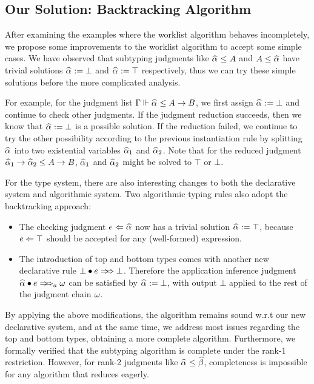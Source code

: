 

\subsection{Our Solution: Backtracking Algorithm}

After examining the examples where the worklist algorithm behaves incompletely,
we propose some improvements to the worklist algorithm to accept some simple cases.
We have observed that subtyping judgments like $\al \le A$ and $A \le \al$ have trivial solutions
$\al := \bot$ and $\al := \top$ respectively,
thus we can try these simple solutions before the more complicated analysis.

For example, for the judgment list $\Gm \Vdash \al \le A \to B$,
we first assign $\al := \bot$ and continue to check other judgments.
If the judgment reduction succeeds, then we know that $\al := \bot$ is a possible solution.
If the reduction failed, we continue to try the other possibility according to the
previous instantiation rule by splitting $\al$ into two existential variables $\al[1]$ and $\al[2]$.
Note that for the reduced judgment $\al[1] \to \al[2] \le A \to B$,
$\al[1]$ and $\al[2]$ might be solved to $\top$ or $\bot$.

For the type system, there are also interesting changes to
both the declarative system and algorithmic system.
Two algorithmic typing rules also adopt the backtracking approach:
\begin{itemize}
    \item The checking judgment $e \Lto \al$ now has a trivial solution $\al := \top$,
        because $e \Leftarrow \top$ should be accepted for any (well-formed) expression.
    \item The introduction of top and bottom types comes with another new declarative rule
        $\appInf{\bot}{e}{\bot}$.
        Therefore the application inference judgment $\appInfAlg{\al}{e}$
        can be satisfied by $\al := \bot$,
        with output $\bot$ applied to the rest of the judgment chain $\omega$.
\end{itemize}

By applying the above modifications,
the algorithm remains sound w.r.t our new declarative system,
and at the same time, we address most issues regarding the top and bottom types,
obtaining a more complete algorithm.
Furthermore, we formally verified that the subtyping algorithm
is complete under the rank-1 restriction.
However, for rank-2 judgments like $\al \le \bt$,
completeness is impossible for any algorithm that reduces eagerly.


